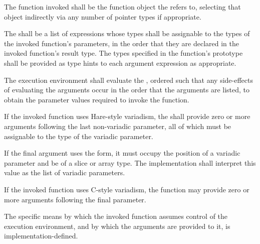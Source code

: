 \specsubsubitem
The function invoked shall be the function object the
 refers to, selecting that object indirectly via
any number of pointer types if appropriate.

\specsubsubitem
The  shall be a list of expressions whose types
shall be assignable to the types of the invoked function's parameters, in the
order that they are declared in the invoked function's result type. The types
specified in the function's prototype shall be provided as type hints to each
argument expression as appropriate.

\specsubsubitem
The execution environment shall evaluate the ,
ordered such that any side-effects of evaluating the arguments occur in the
order that the arguments are listed, to obtain the parameter values required to
invoke the function.

\specsubsubitem
If the invoked function uses Hare-style variadism, the
 shall provide zero or more arguments following the
last non-variadic parameter, all of which must be assignable to the type of the
variadic parameter.

\specsubsubitem
If the final argument uses the  form, it must occupy the position of a
variadic parameter and be of a slice or array type. The implementation shall
interpret this value as the list of variadic parameters.

\specsubsubitem
If the invoked function uses C-style variadism, the function may provide zero
or more arguments following the final parameter.

\specsubsubitem
The specific means by which the invoked function assumes control of the
execution environment, and by which the arguments are provided to it, is
implementation-defined.



